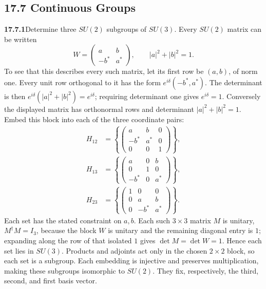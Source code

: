 \subsection*{17.7 Continuous Groups}

\par\bigskip
\noindent\textbf{17.7.1}\quad Determine three $SU(2)$ subgroups of
$SU(3)$.
\solution
Every $SU(2)$ matrix can be written
\[
W=\begin{pmatrix}a&b\\-b^*&a^*\end{pmatrix},
\qquad |a|^2+|b|^2=1.
\]
To see that this describes every such matrix, let its first row be
$(a,b)$, of norm one. Every unit row orthogonal to it has the
form $e^{i\delta}(-b^*,a^*)$. The determinant is then
$e^{i\delta}(|a|^2+|b|^2)=e^{i\delta}$; requiring determinant
one gives $e^{i\delta}=1$. Conversely the displayed matrix has
orthonormal rows and determinant $|a|^2+|b|^2=1$.
Embed this block into each of the three coordinate pairs:
\[
\boxed{\begin{aligned}
H_{12}&=\left\{\begin{pmatrix}a&b&0\\-b^*&a^*&0\\0&0&1\end{pmatrix}\right\},\\
H_{13}&=\left\{\begin{pmatrix}a&0&b\\0&1&0\\-b^*&0&a^*\end{pmatrix}\right\},\\
H_{23}&=\left\{\begin{pmatrix}1&0&0\\0&a&b\\0&-b^*&a^*\end{pmatrix}\right\}.
\end{aligned}}
\]
Each set has the stated constraint on $a,b$.
Each such $3\times3$ matrix $M$ is unitary, $M^\dagger M=I_3$, because
the block $W$ is unitary and the remaining diagonal entry is $1$;
expanding along the row of that isolated $1$ gives $\det M=\det W=1$.
Hence each set lies in $SU(3)$.
Products and adjoints act only in the chosen $2\times2$ block,
so each set is a subgroup. Each embedding is injective and
preserves multiplication, making these subgroups isomorphic to
$SU(2)$. They fix, respectively, the third, second, and first basis vector.

